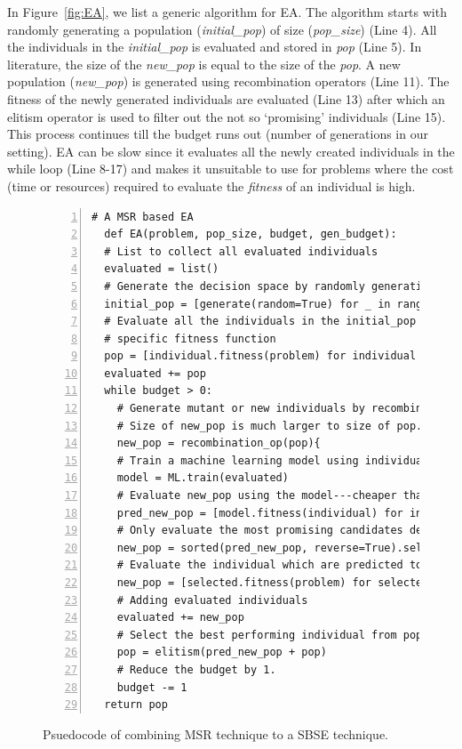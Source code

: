 \documentclass[table, xcdraw, sigconf,review, anonymous]{acmart}
\begin{document}
In Figure~\ref{fig:EA},  we list a generic algorithm for EA. The algorithm starts with randomly generating a population (\textit{initial\_pop}) of size (\textit{pop\_size}) (Line 4). All the individuals in the \textit{initial\_pop} is evaluated and stored in \textit{pop} (Line 5). In literature, the size of the \textit{new\_pop} is equal to the size of the \textit{pop}. A new population (\textit{new\_pop}) is generated using recombination operators (Line 11). The fitness of the newly generated individuals are evaluated (Line 13) after which an elitism operator is used to filter out the not so `promising' individuals (Line 15).  This process continues till the budget runs out (number of generations in our setting).
EA can be slow since it evaluates all the newly created individuals in the while loop (Line 8-17) and makes it unsuitable to use for problems where the cost (time or resources) required to evaluate the \textit{fitness} of an individual is high.

\begin{figure}[t]
\small
\hspace{0.4cm}
\begin{lstlisting}[xleftmargin=5.0ex,mathescape,frame=none,numbers=left,linebackgroundcolor={%
        \ifnum\value{lstnumber}>11
            \ifnum\value{lstnumber}<25
                \color{gray!25}
            \fi
        \fi},autogobble=true,]
  # A MSR based EA
  def EA(problem, pop_size, budget, gen_budget):
  # List to collect all evaluated individuals
  evaluated = list()
  # Generate the decision space by randomly generating solutions
  initial_pop = [generate(random=True) for _ in range(pop_size)]
  # Evaluate all the individuals in the initial_pop using problem 
  # specific fitness function
  pop = [individual.fitness(problem) for individual in initial_pop]
  evaluated += pop
  while budget > 0:
    # Generate mutant or new individuals by recombining individuals from pop.
    # Size of new_pop is much larger to size of pop.
    new_pop = recombination_op(pop){
    # Train a machine learning model using individuals from pop 
    model = ML.train(evaluated)
    # Evaluate new_pop using the model---cheaper than individual.fitness 
    pred_new_pop = [model.fitness(individual) for individual in new_pop]
    # Only evaluate the most promising candidates defined by gen_budget
    new_pop = sorted(pred_new_pop, reverse=True).select(gen_budget)
    # Evaluate the individual which are predicted to be promising
    new_pop = [selected.fitness(problem) for selected in new_pop]
    # Adding evaluated individuals
    evaluated += new_pop
    # Select the best performing individual from pop + new_pop
    pop = elitism(pred_new_pop + pop)
    # Reduce the budget by 1. 
    budget -= 1
  return pop

\end{lstlisting}
\caption{\small{Psuedocode of combining MSR technique to a SBSE technique.}
}
\label{fig:MSREA}  
\end{figure}
\end{document}
